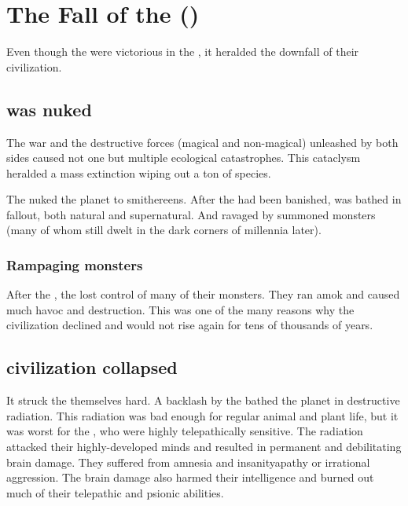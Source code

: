 








\section{The Fall of the \Ophidians ()}
Even though the \ophidians{} were victorious in the \firstbanewar{}, it  heralded the downfall of their civilization. 









\subsection{\Miith was nuked}
The war and the destructive forces (magical and non-magical) unleashed by both sides caused not one but multiple ecological catastrophes. 
This cataclysm heralded a mass extinction wiping out a ton of species. 

The \firstbanewar nuked the planet to smithereens. 
After the \banes had been banished, \Miith was bathed in fallout, both natural and supernatural. 
And ravaged by summoned monsters (many of whom still dwelt in the dark corners of \Miith millennia later). 





\subsubsection{Rampaging monsters}
After the \firstbanewar, the \ophidians lost control of many of their monsters. 
They ran amok and caused much havoc and destruction.
This was one of the many reasons why the \ophidian civilization declined and would not rise again for tens of thousands of years. 






\subsection{\Ophidian civilization collapsed}
It struck the \ophidians{} themselves hard. 
A backlash by the \banelords{} bathed the planet in destructive radiation. 
This radiation was bad enough for regular animal and plant life, but it was worst for the \ophidians, who were highly telepathically sensitive. 
The radiation attacked their highly-developed minds and resulted in permanent and debilitating brain damage. 
They suffered from amnesia and insanity\dash apathy or irrational aggression. 
The brain damage also harmed their intelligence and burned out much of their telepathic and psionic abilities. 

